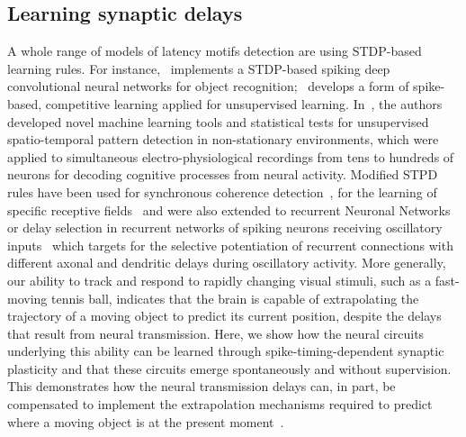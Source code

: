 \documentclass[brainsci, %
               review,submit,pdftex,moreauthors%
               ]{Definitions/mdpi}
\begin{document}
\subsection{Learning synaptic delays}
A whole range of models of latency motifs detection are using STDP-based learning rules. For instance,~\citep{kheradpisheh_stdp-based_2018} implements a STDP-based spiking deep convolutional neural networks for object recognition;~\citep{tavanaei_representation_2018} develops a form of spike-based, competitive learning applied for unsupervised learning. In~\citep{russo_cell_2017}, the authors developed novel machine learning tools and statistical tests for unsupervised spatio-temporal pattern detection in non-stationary environments, which were applied to simultaneous electro-physiological recordings from tens to hundreds of neurons for decoding cognitive processes from neural activity.
%
Modified STPD rules have been used for synchronous coherence detection~\citep{perrinet_coherence_2002}, for the learning of specific receptive fields~\citep{perrinet_networks_2001} and were also extended to recurrent Neuronal Networks~\citep{gilson_stdp_2010} or delay selection in recurrent networks of spiking neurons receiving oscillatory inputs~\citep{kerr_delay_2013} which targets for the selective potentiation of recurrent connections with different axonal and dendritic delays during oscillatory activity. More generally, our ability to track and respond to rapidly changing visual stimuli, such as a fast-moving tennis ball, indicates that the brain is capable of extrapolating the trajectory of a moving object to predict its current position, despite the delays that result from neural transmission. Here, we show how the neural circuits underlying this ability can be learned through spike-timing-dependent synaptic plasticity and that these circuits emerge spontaneously and without supervision. This demonstrates how the neural transmission delays can, in part, be compensated to implement the extrapolation mechanisms required to predict where a moving object is at the present moment~\citep{burkitt_predictive_2021}.
\end{document}
